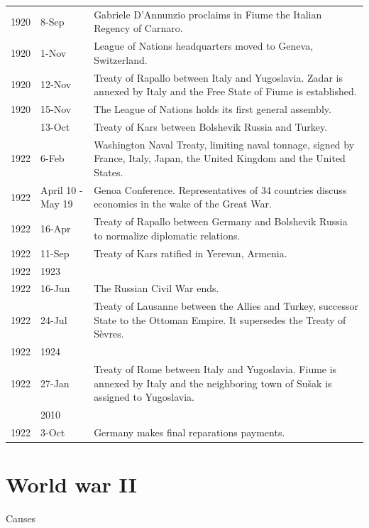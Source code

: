 \documentclass[
  openany]{book}
\begin{document}
\begin{longtable}[t]{rl>{\raggedright\arraybackslash}p{22em}}
1920 & 8-Sep & Gabriele D'Annunzio proclaims in Fiume the Italian Regency of Carnaro.\\
\rowcolor{gray!6}  1920 & 1-Nov & League of Nations headquarters moved to Geneva, Switzerland.\\
1920 & 12-Nov & Treaty of Rapallo between Italy and Yugoslavia. Zadar is annexed by Italy and the Free State of Fiume is established.\\
\rowcolor{gray!6}  1920 & 15-Nov & The League of Nations holds its first general assembly.\\
\addlinespace
1921 & 13-Oct & Treaty of Kars between Bolshevik Russia and Turkey.\\
\rowcolor{gray!6}  1922 & 6-Feb & Washington Naval Treaty, limiting naval tonnage, signed by France, Italy, Japan, the United Kingdom and the United States.\\
1922 & April 10 - May 19 & Genoa Conference. Representatives of 34 countries discuss economics in the wake of the Great War.\\
\rowcolor{gray!6}  1922 & 16-Apr & Treaty of Rapallo between Germany and Bolshevik Russia to normalize diplomatic relations.\\
1922 & 11-Sep & Treaty of Kars ratified in Yerevan, Armenia.\\
\addlinespace
\rowcolor{gray!6}  1922 & 1923 & 1923\\
1922 & 16-Jun & The Russian Civil War ends.\\
\rowcolor{gray!6}  1922 & 24-Jul & Treaty of Lausanne between the Allies and Turkey, successor State to the Ottoman Empire. It supersedes the Treaty of Sèvres.\\
1922 & 1924 & 1924\\
\rowcolor{gray!6}  1922 & 27-Jan & Treaty of Rome between Italy and Yugoslavia. Fiume is annexed by Italy and the neighboring town of Sušak is assigned to Yugoslavia.\\
\addlinespace
1922 & 2010 & 2010\\
\rowcolor{gray!6}  1922 & 3-Oct & Germany makes final reparations payments.\\
\bottomrule
\end{longtable}

\hypertarget{world-war-ii}{%
\section{World war II}\label{world-war-ii}}

Causes
\end{document}
